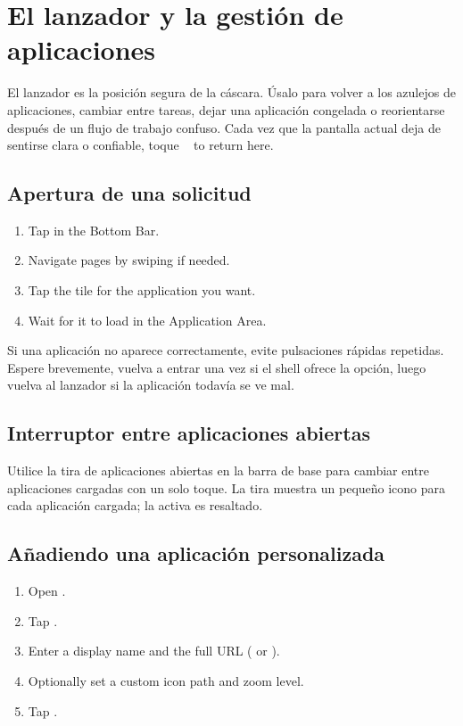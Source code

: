 \chapter{El lanzador y la gestión de aplicaciones}
\label{ch:launcher}

El lanzador es la posición segura de la cáscara.
Úsalo para volver a los azulejos de aplicaciones, cambiar entre tareas, dejar una aplicación congelada o
reorientarse después de un flujo de trabajo confuso.
Cada vez que la pantalla actual deja de sentirse clara o confiable, toque
~ to return here.


\section{Apertura de una solicitud}

\begin{enumerate}
  \item Tap  in the Bottom Bar.
  \item Navigate pages by swiping if needed.
  \item Tap the tile for the application you want.
  \item Wait for it to load in the Application Area.
\end{enumerate}

Si una aplicación no aparece correctamente, evite pulsaciones rápidas repetidas.
Espere brevemente, vuelva a entrar una vez si el shell ofrece la opción, luego vuelva al lanzador
si la aplicación todavía se ve mal.

\section{Interruptor entre aplicaciones abiertas}

Utilice la tira de aplicaciones abiertas en la barra de base para cambiar entre aplicaciones cargadas
con un solo toque.
La tira muestra un pequeño icono para cada aplicación cargada; la activa es
resaltado.

\section{Añadiendo una aplicación personalizada}

\begin{enumerate}
  \item Open .
  \item Tap .
  \item Enter a display name and the full URL ( or ).
  \item Optionally set a custom icon path and zoom level.
  \item Tap .
\end{enumerate}

